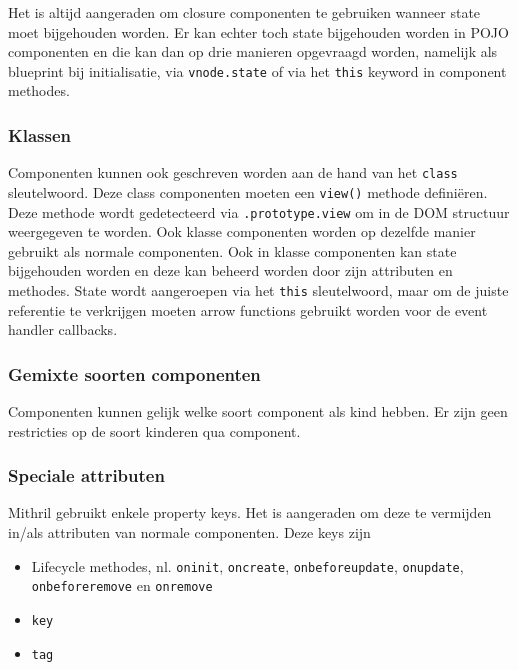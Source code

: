 Het is altijd aangeraden om closure componenten te gebruiken wanneer state moet bijgehouden worden. Er kan echter toch state bijgehouden worden in POJO componenten en die kan dan op drie manieren opgevraagd worden, namelijk als blueprint bij initialisatie, via \texttt{vnode.state} of via het \texttt{this} keyword in component methodes. \autocite{Mithril2019a}

\subsubsection{Klassen}

Componenten kunnen ook geschreven worden aan de hand van het \texttt{class} sleutelwoord. Deze class componenten moeten een \texttt{view()} methode definiëren. Deze methode wordt gedetecteerd via \texttt{.prototype.view} om in de DOM structuur weergegeven te worden. Ook klasse componenten worden op dezelfde manier gebruikt als normale componenten. Ook in klasse componenten kan state bijgehouden worden en deze kan beheerd worden door zijn attributen en methodes. State wordt aangeroepen via het \texttt{this} sleutelwoord, maar om de juiste referentie te verkrijgen moeten arrow functions gebruikt worden voor de event handler callbacks. \autocite{Mithril2019a}

\subsubsection{Gemixte soorten componenten}

Componenten kunnen gelijk welke soort component als kind hebben. Er zijn geen restricties op de soort kinderen qua component. \autocite{Mithril2019a}

\subsubsection{Speciale attributen}

Mithril gebruikt enkele property keys. Het is aangeraden om deze te vermijden in/als attributen van normale componenten. Deze keys zijn \autocite{Mithril2019a}
\begin{itemize}
    \item Lifecycle methodes, nl. \texttt{oninit}, \texttt{oncreate}, \texttt{onbeforeupdate}, \texttt{onupdate}, \texttt{onbeforeremove} en \texttt{onremove}
    \item \texttt{key}
    \item \texttt{tag}
\end{itemize}


